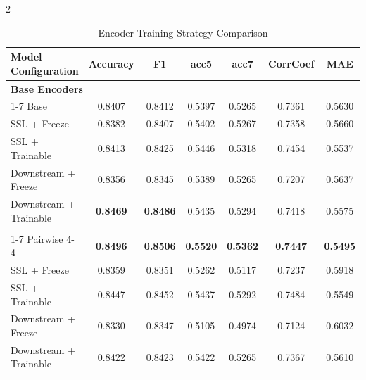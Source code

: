 \documentclass[10pt]{article}
\begin{document}
\begin{multicols}{2}
\begin{table}[t]
    \centering
    \caption{Encoder Training Strategy Comparison}
    \label{tab:training}
    \begin{tabular}{lcccccc}
    \toprule
    \textbf{Model Configuration} & \textbf{Accuracy} & \textbf{F1} & \textbf{acc5} & \textbf{acc7} & \textbf{CorrCoef} & \textbf{MAE} \\
    \midrule
    \multicolumn{7}{l}{\textbf{Base Encoders}} \\
    \cmidrule(lr){1-7}
    Base & 0.8407 & 0.8412 & 0.5397 & 0.5265 & 0.7361 & 0.5630 \\
    SSL + Freeze & 0.8382 & 0.8407 & 0.5402 & 0.5267 & 0.7358 & 0.5660 \\
    SSL + Trainable & 0.8413 & 0.8425 & 0.5446 & 0.5318 & 0.7454 & 0.5537 \\
    Downstream + Freeze & 0.8356 & 0.8345 & 0.5389 & 0.5265 & 0.7207 & 0.5637 \\
    Downstream + Trainable & \textbf{0.8469} & \textbf{0.8486} & 0.5435 & 0.5294 & 0.7418 & 0.5575 \\
    \addlinespace
    \multicolumn{7}{l}{\textbf{VarDepth Encoders}} \\
    \cmidrule(lr){1-7}
    Pairwise 4-4 & \textbf{0.8496} & \textbf{0.8506} & \textbf{0.5520} & \textbf{0.5362} & \textbf{0.7447} & \textbf{0.5495} \\
    SSL + Freeze & 0.8359 & 0.8351 & 0.5262 & 0.5117 & 0.7237 & 0.5918 \\
    SSL + Trainable & 0.8447 & 0.8452 & 0.5437 & 0.5292 & 0.7484 & 0.5549 \\
    Downstream + Freeze & 0.8330 & 0.8347 & 0.5105 & 0.4974 & 0.7124 & 0.6032 \\
    Downstream + Trainable & 0.8422 & 0.8423 & 0.5422 & 0.5265 & 0.7367 & 0.5610 \\
    \bottomrule
    \end{tabular}
\end{table}


\end{multicols}
\end{document}
